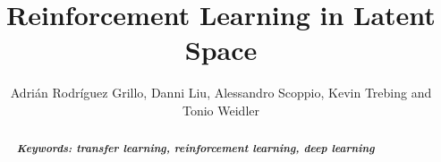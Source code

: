\documentclass[10pt]{article}
\title{Reinforcement Learning in Latent Space}
\author{Adrián Rodríguez Grillo, Danni Liu, Alessandro Scoppio, Kevin Trebing and Tonio Weidler}
\begin{document}
\maketitle
\begin{abstract}

{{\it \bf Keywords: transfer learning, reinforcement learning, deep learning}}
\end{abstract}









{\tiny\printbibliography}

\clearpage
\raggedbottom
\appendix
\begin{appendix}
\end{appendix}
\end{document}
